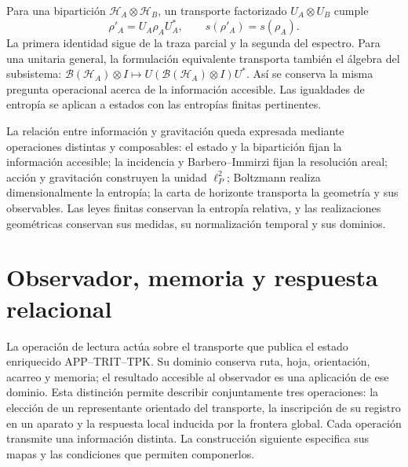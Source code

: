 Para una bipartición \(\mathcal H_A\otimes\mathcal H_B\), un
transporte factorizado \(U_A\otimes U_B\) cumple
\[
 \rho'_A=U_A\rho_AU_A^*,\qquad s(\rho'_A)=s(\rho_A).
\]
La primera identidad sigue de la traza parcial y la segunda del espectro.
Para una unitaria general, la formulación equivalente transporta también
el álgebra del subsistema:
\(\mathcal B(\mathcal H_A)\otimes I\mapsto
U(\mathcal B(\mathcal H_A)\otimes I)U^*\).
Así se conserva la misma pregunta operacional acerca de la información
accesible. Las igualdades de entropía se aplican a estados con las entropías
finitas pertinentes.

La relación entre información y gravitación queda expresada mediante
operaciones distintas y composables: el estado y la bipartición fijan la
información accesible; la incidencia y Barbero--Immirzi fijan la resolución
areal; acción y gravitación construyen la unidad \(\ell_P^2\);
Boltzmann realiza dimensionalmente la entropía; la carta de horizonte
transporta la geometría y sus observables. Las leyes finitas conservan la
entropía relativa, y las realizaciones geométricas conservan sus medidas,
su normalización temporal y sus dominios.




\chapter{Observador, memoria y respuesta relacional}
\label{x_reciprocidad:vii:sec:observador-respuesta}

La operación de lectura actúa sobre el transporte que publica el estado
enriquecido APP--TRIT--TPK. Su dominio conserva ruta, hoja, orientación,
acarreo y memoria; el resultado accesible al observador es una aplicación
de ese dominio. Esta distinción permite describir conjuntamente tres
operaciones: la elección de un representante orientado del transporte,
la inscripción de su registro en un aparato y la respuesta local inducida
por la frontera global. Cada operación transmite una información distinta.
La construcción siguiente especifica sus mapas y las condiciones que
permiten componerlos.

